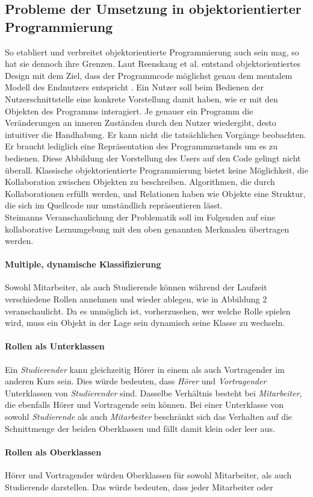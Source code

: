\documentclass[conference]{IEEEtran}
\begin{document}
	
\subsection{Probleme der Umsetzung in objektorientierter Programmierung}  
So etabliert und verbreitet objektorientierte Programmierung auch sein mag, so hat sie dennoch ihre Grenzen. Laut Reenskaug et al. entstand objektorientiertes Design mit dem Ziel, dass der Programmcode möglichst genau dem mentalem Modell des Endnutzers entspricht \cite{reenskaug2009dci}. Ein Nutzer soll beim Bedienen der Nutzerschnittstelle eine konkrete Vorstellung damit haben, wie er mit den Objekten des Programms interagiert. Je genauer ein Programm die Veränderungen an inneren Zuständen durch den Nutzer wiedergibt, desto intuitiver die Handhabung. Er kann nicht die tatsächlichen Vorgänge beobachten. Er braucht lediglich eine Repräsentation des Programmzustands um es zu bedienen. Diese Abbildung der Vorstellung des Users auf den Code gelingt nicht überall. Klassische objektorientierte Programmierung bietet keine Möglichkeit, die Kollaboration zwischen Objekten zu beschreiben. Algorithmen, die durch Kollaborationen erfüllt werden, und Relationen haben wie Objekte eine Struktur, die sich im Quellcode nur umständlich repräsentieren lässt. \\Steimanns Veranschaulichung der Problematik soll im Folgenden auf eine kollaborative Lernumgebung mit den oben genannten Merkmalen übertragen werden\cite{steimann2000representation}.\paragraph{Multiple, dynamische Klassifizierung} Sowohl Mitarbeiter, als auch Studierende können während der Laufzeit verschiedene Rollen annehmen und wieder ablegen, wie in Abbildung 2 veranschaulicht. Da es unmöglich ist,  vorherzusehen, wer welche Rolle spielen wird, muss ein Objekt in der Lage sein dynamisch seine Klasse zu wechseln. \paragraph{Rollen als Unterklassen} Ein \textit{Studierender} kann gleichzeitig Hörer in einem als auch Vortragender im anderen Kurs sein. Dies würde bedeuten, dass \textit{Hörer} und \textit{Vortragender} Unterklassen von \textit{Studierender} sind. Dasselbe Verhältnis besteht bei \textit{Mitarbeiter}, die ebenfalls Hörer und Vortragende sein können. Bei einer Unterklasse von sowohl \textit{Studierende} als auch \textit{Mitarbeiter} beschränkt sich das Verhalten auf die Schnittmenge der beiden Oberklassen und fällt damit klein oder leer aus.\paragraph{Rollen als Oberklassen} Hörer und Vortragender würden Oberklassen für sowohl Mitarbeiter, als auch Studierende darstellen. Das würde bedeuten, dass jeder Mitarbeiter oder 
\end{document}
